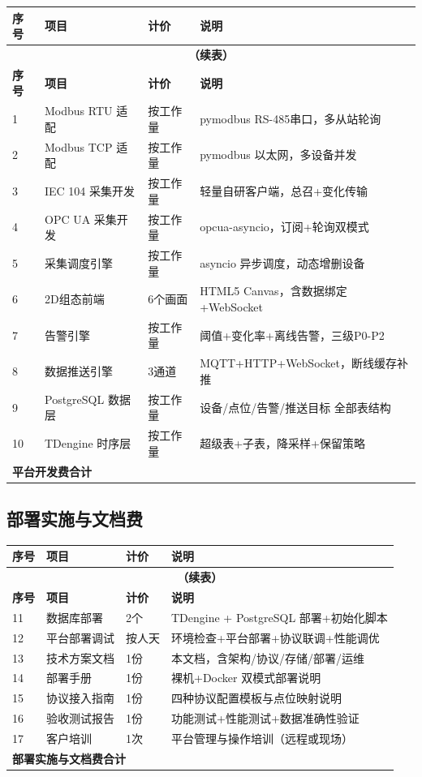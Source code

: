 \documentclass[12pt,a4paper]{ctexart}
\begin{document}
\begin{longtable}{p{1.2cm}p{4cm}p{2.5cm}p{5.5cm}}
\toprule\textbf{序号} & \textbf{项目} & \textbf{计价} & \textbf{说明} \\
\midrule
\endfirsthead
\multicolumn{4}{c}{\textbf{（续表）}}\\
\toprule\textbf{序号} & \textbf{项目} & \textbf{计价} & \textbf{说明} \\
\midrule
\endhead
1 & Modbus RTU 适配 & 按工作量 & pymodbus RS-485串口，多从站轮询 \\
2 & Modbus TCP 适配 & 按工作量 & pymodbus 以太网，多设备并发 \\
3 & IEC 104 采集开发 & 按工作量 & 轻量自研客户端，总召+变化传输 \\
4 & OPC UA 采集开发 & 按工作量 & opcua-asyncio，订阅+轮询双模式 \\
5 & 采集调度引擎 & 按工作量 & asyncio 异步调度，动态增删设备 \\
6 & 2D组态前端 & 6个画面 & HTML5 Canvas，含数据绑定+WebSocket \\
7 & 告警引擎 & 按工作量 & 阈值+变化率+离线告警，三级P0-P2 \\
8 & 数据推送引擎 & 3通道 & MQTT+HTTP+WebSocket，断线缓存补推 \\
9 & PostgreSQL 数据层 & 按工作量 & 设备/点位/告警/推送目标 全部表结构 \\
10 & TDengine 时序层 & 按工作量 & 超级表+子表，降采样+保留策略 \\
\hline
\multicolumn{4}{l}{\textbf{平台开发费合计}} \\
\bottomrule
\end{longtable}

\subsection{部署实施与文档费}

\begin{longtable}{p{1.2cm}p{4cm}p{2.5cm}p{5.5cm}}
\toprule\textbf{序号} & \textbf{项目} & \textbf{计价} & \textbf{说明} \\
\midrule
\endfirsthead
\multicolumn{4}{c}{\textbf{（续表）}}\\
\toprule\textbf{序号} & \textbf{项目} & \textbf{计价} & \textbf{说明} \\
\midrule
\endhead
11 & 数据库部署 & 2个 & TDengine + PostgreSQL 部署+初始化脚本 \\
12 & 平台部署调试 & 按人天 & 环境检查+平台部署+协议联调+性能调优 \\
13 & 技术方案文档 & 1份 & 本文档，含架构/协议/存储/部署/运维 \\
14 & 部署手册 & 1份 & 裸机+Docker 双模式部署说明 \\
15 & 协议接入指南 & 1份 & 四种协议配置模板与点位映射说明 \\
16 & 验收测试报告 & 1份 & 功能测试+性能测试+数据准确性验证 \\
17 & 客户培训 & 1次 & 平台管理与操作培训（远程或现场） \\
\hline
\multicolumn{4}{l}{\textbf{部署实施与文档费合计}} \\
\bottomrule
\end{longtable}
\end{document}
